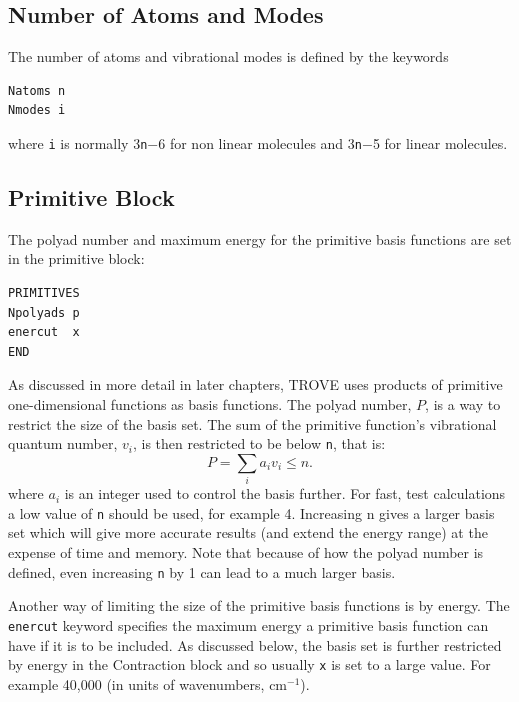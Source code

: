 \subsection{Number of Atoms and Modes}
The number of atoms and vibrational modes is defined by the keywords
\begin{verbatim}
Natoms n
Nmodes i
\end{verbatim}
where \verb|i| is normally 3\verb|n|$-$6 for non linear molecules and 3\verb|n|$-$5 for linear molecules.

\subsection{Primitive Block}
The polyad number and maximum energy for the primitive basis functions are set in the primitive block:
\begin{verbatim}
PRIMITIVES
Npolyads p
enercut  x
END
\end{verbatim}
As discussed in more detail in later chapters, TROVE uses products of primitive one-dimensional functions as basis functions. 
The polyad number, $P$, is a way to restrict the size of the basis set.\cite{TROVE} 
The sum of the primitive function's vibrational quantum number, $v_i$, is then restricted to be below \verb|n|, that is:
\begin{equation}
\label{eq.polyad}
P = \sum_i a_i v_i \le n.
\end{equation}
where $a_i$ is an integer used to control the basis further.
For fast, test calculations a low value of \verb|n| should be used, for example 4. 
Increasing n gives a larger basis set which will give more accurate results (and extend the energy range) 
at the expense of time and memory.
Note that because of how the polyad number is defined, even increasing \verb|n| by 1 can lead to a much larger basis.

Another way of limiting the size of the primitive basis functions is by energy. 
The \verb|enercut| keyword specifies the maximum energy a primitive basis function can have if it is to be included. 
As discussed below, the basis set is further restricted by energy in the Contraction block and so usually \verb|x|
 is set to a large value. For example 40,000 (in units of wavenumbers, cm$^{-1}$). 

